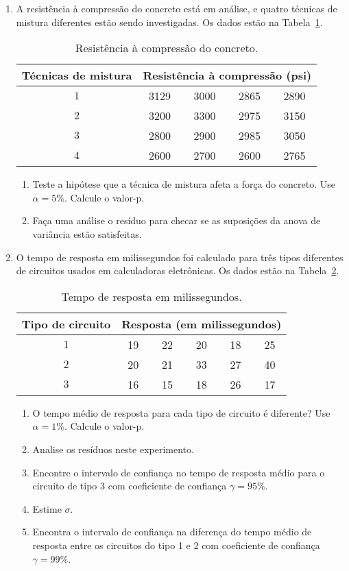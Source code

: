 \documentclass[11pt, a4paper]{article}
\begin{document}
\begin{enumerate}
	\item A resistência à compressão do concreto está em análise, e quatro técnicas de mistura diferentes estão sendo investigadas. Os dados estão na Tabela~\ref{tab:resistencia-concreto}.
	\begin{table}[htbp]
		\centering
		\begin{tabular}{c|cccc}
			\toprule[0.05cm]
			Técnicas de mistura & \multicolumn{4}{|c}{Resistência à compressão (psi)} \\ \midrule[0.025cm]
			$1$ & 3129 & 3000 & 2865 & 2890\\
			$2$ & 3200 & 3300 & 2975 & 3150\\
			$3$ & 2800 & 2900 & 2985 & 3050\\
			$4$ & 2600 & 2700 & 2600 & 2765\\ \bottomrule[0.05cm]
		\end{tabular}
		\caption{Resistência à compressão do concreto.}
		\label{tab:resistencia-concreto}
	\end{table}
	\begin{enumerate}
		\item Teste a hipótese que a técnica de mistura afeta a força do concreto. Use $\alpha=5\%$. Calcule o valor-p.
		\item Faça uma análise o resíduo para checar se as suposições da anova de variância estão satisfeitas.
	\end{enumerate}

	\item O tempo de resposta em milissegundos foi calculado para três tipos diferentes de circuitos usados em calculadoras eletrônicas. Os dados estão na Tabela~\ref{tab:resposta-circuito}.
	\begin{table}[htbp]
		\centering
		\begin{tabular}{c|ccccc}
			\toprule[0.05cm]
			Tipo de circuito & \multicolumn{5}{|c}{Resposta (em milissegundos)} \\
			\midrule[0.025cm]
			$1$ & 19 & 22 & 20 & 18 & 25\\
			$2$ & 20 & 21 & 33 & 27 & 40\\
			$3$ & 16 & 15 & 18 & 26 & 17\\
			\bottomrule[0.05cm]
		\end{tabular}
		\caption{Tempo de resposta em milissegundos.}
		\label{tab:resposta-circuito}
	\end{table} 
	\begin{enumerate}
		\item O tempo médio de resposta para cada tipo de circuito é diferente? Use $\alpha = 1\%$. Calcule o valor-p.
		\item Analise os resíduos neste experimento.
		\item Encontre o intervalo de confiança no tempo de resposta médio para o circuito de tipo 3 com coeficiente de confiança $\gamma=95\%$.
		\item Estime $\sigma$.
		\item Encontra o intervalo de confiança na diferença do tempo médio de resposta entre os circuitos do tipo 1 e 2 com coeficiente de confiança $\gamma=99\%$.
	\end{enumerate}


\end{enumerate}
\end{document}
